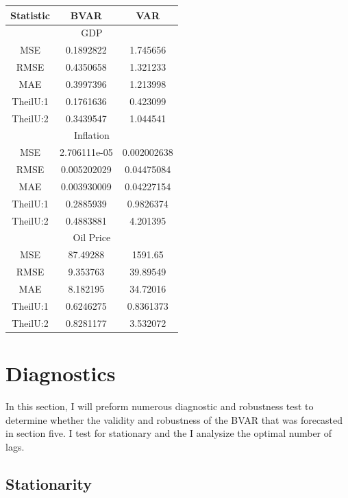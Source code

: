 \documentclass[11pt,preprint, authoryear]{elsarticle}
\let\origtable\table
\let\endorigtable\endtable
\renewenvironment{table}[1][2] {
    \expandafter\origtable\expandafter[H]
} {
    \endorigtable
}
\numberwithin{equation}{section}
\numberwithin{figure}{section}
\numberwithin{table}{section}
\begin{document}
\begin{table}
\begin{center}
\begin{tabular}{|c|c|c|} 
  \hline
 Statistic & BVAR & VAR \\ 
 \hline
 \multicolumn{3}{|c|}{GDP} \\
 \hline
MSE & 0.1892822 & 1.745656 \\
RMSE & 0.4350658 & 1.321233 \\
MAE & 0.3997396 & 1.213998 \\
TheilU:1 & 0.1761636 & 0.423099 \\
TheilU:2 & 0.3439547 & 1.044541 \\
\hline
\multicolumn{3}{|c|}{Inflation} \\
 \hline
 MSE & 2.706111e-05 & 0.002002638 \\
RMSE & 0.005202029 & 0.04475084 \\
MAE & 0.003930009 & 0.04227154 \\
TheilU:1 & 0.2885939 & 0.9826374 \\
TheilU:2 & 0.4883881 & 4.201395 \\
\hline
\multicolumn{3}{|c|}{Oil Price} \\
 \hline
MSE & 87.49288 & 1591.65 \\
RMSE & 9.353763 & 39.89549 \\
MAE & 8.182195 & 34.72016 \\
TheilU:1 & 0.6246275 & 0.8361373 \\
TheilU:2 & 0.8281177 & 3.532072 \\
\hline
\end{tabular}
\caption{Forecasting Statistics }
 \label{gdpstat}
\end{center}
\end{table}

\hypertarget{diagnostics}{%
\section{Diagnostics}\label{diagnostics}}

In this section, I will preform numerous diagnostic and robustness test
to determine whether the validity and robustness of the BVAR that was
forecasted in section five. I test for stationary and the I analysize
the optimal number of lags.

\hypertarget{stationarity}{%
\subsection{Stationarity}\label{stationarity}}
\end{document}
